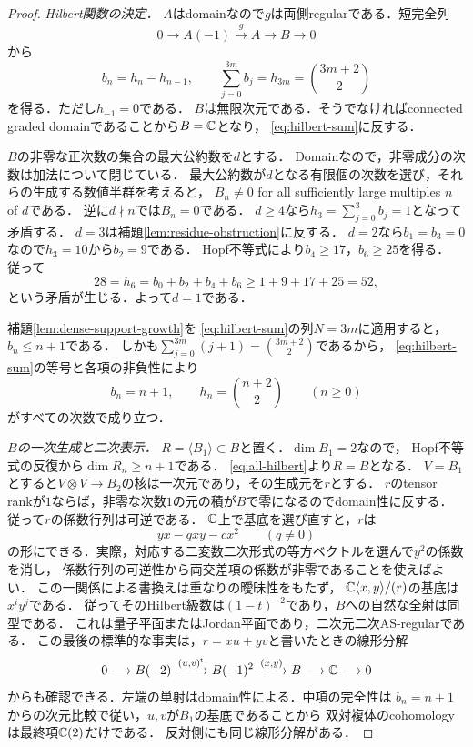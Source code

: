 \documentclass[11pt,a4paper]{ltjsarticle}
\begin{document}
\begin{proof}
\emph{Hilbert関数の決定．}
$A$はdomainなので$g$は両側regularである．短完全列
\[
 0\longrightarrow A(-1)\xrightarrow{\,g\,}A\longrightarrow B\longrightarrow0
\]
から
\begin{equation}
\label{eq:hilbert-sum}
 b_n=h_n-h_{n-1},\qquad
 \sum_{j=0}^{3m}b_j=h_{3m}=\binom{3m+2}{2}
\end{equation}
を得る．ただし$h_{-1}=0$である．
$B$は無限次元である．そうでなければconnected graded domainであることから$B=\mathbb C$となり，
\eqref{eq:hilbert-sum}に反する．

$B$の非零な正次数の集合の最大公約数を$d$とする．
Domainなので，非零成分の次数は加法について閉じている．
最大公約数が$d$となる有限個の次数を選び，それらの生成する数値半群を考えると，
$B_n\ne0$ for all sufficiently large multiples $n$ of $d$である．
逆に$d\nmid n$では$B_n=0$である．
$d\geq4$なら$h_3=\sum_{j=0}^3b_j=1$となって矛盾する．
$d=3$は補題\ref{lem:residue-obstruction}に反する．
$d=2$なら$b_1=b_3=0$なので$h_3=10$から$b_2=9$である．
Hopf不等式により$b_4\geq17$，$b_6\geq25$を得る．
従って
\[
 28=h_6=b_0+b_2+b_4+b_6\geq1+9+17+25=52,
\]
という矛盾が生じる．よって$d=1$である．

補題\ref{lem:dense-support-growth}を
\eqref{eq:hilbert-sum}の列$N=3m$に適用すると，$b_n\leq n+1$である．
しかも$\sum_{j=0}^{3m}(j+1)=\binom{3m+2}{2}$であるから，
\eqref{eq:hilbert-sum}の等号と各項の非負性により
\begin{equation}
\label{eq:all-hilbert}
 b_n=n+1,\qquad h_n=\binom{n+2}{2}\qquad(n\geq0)
\end{equation}
がすべての次数で成り立つ．

\emph{$B$の一次生成と二次表示．}
$R=\langle B_1\rangle\subset B$と置く．$\dim B_1=2$なので，
Hopf不等式の反復から$\dim R_n\geq n+1$である．
\eqref{eq:all-hilbert}より$R=B$となる．
$V=B_1$とすると$V\otimes V\to B_2$の核は一次元であり，その生成元を$r$とする．
$r$のtensor rankが$1$ならば，非零な次数$1$の元の積が$B$で零になるのでdomain性に反する．
従って$r$の係数行列は可逆である．
$\mathbb C$上で基底を選び直すと，$r$は
\[
 yx-qxy-cx^2\qquad(q\ne0)
\]
の形にできる．実際，対応する二変数二次形式の等方ベクトルを選んで$y^2$の係数を消し，
係数行列の可逆性から両交差項の係数が非零であることを使えばよい．
この一関係による書換えは重なりの曖昧性をもたず，
$\mathbb C\langle x,y\rangle/(r)$の基底は$x^iy^j$である．
従ってそのHilbert級数は$(1-t)^{-2}$であり，$B$への自然な全射は同型である．
これは量子平面またはJordan平面であり，二次元二次AS-regularである．
この最後の標準的な事実は，$r=xu+yv$と書いたときの線形分解
\[
 0\longrightarrow B(-2)\xrightarrow{(u,v)^{\mathsf t}}
 B(-1)^2\xrightarrow{(x,y)}B\longrightarrow\mathbb C\longrightarrow0
\]
からも確認できる．左端の単射はdomain性による．中項の完全性は
$b_n=n+1$からの次元比較で従い，$u,v$が$B_1$の基底であることから
双対複体のcohomologyは最終項$\mathbb C(2)$だけである．
反対側にも同じ線形分解がある．


\end{proof}
\end{document}
